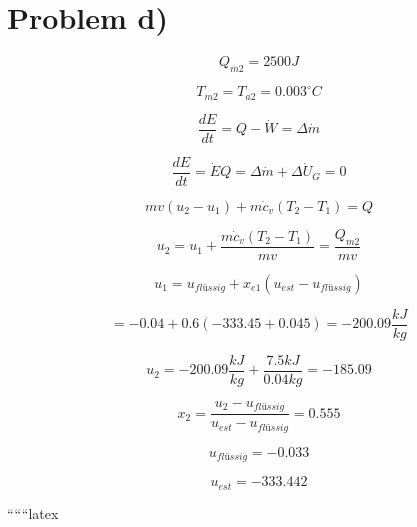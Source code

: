 \section*{Problem d)}

\[
Q_{m2} = 2500 J
\]

\[
T_{m2} = T_{a2} = 0.003^\circ C
\]

\[
\frac{dE}{dt} = Q - \dot{W} = \Delta \dot{m}
\]

\[
\frac{dE}{dt} = \dot{E}Q = \Delta \dot{m} + \Delta \dot{U}_G = 0
\]

\[
m v (u_2 - u_1) + m \dot{c}_v (T_2 - T_1) = Q
\]

\[
u_2 = u_1 + \frac{m \dot{c}_v (T_2 - T_1)}{m v} = \frac{Q_{m2}}{m v}
\]

\[
u_1 = u_{flüssig} + x_{e1} (u_{est} - u_{flüssig})
\]

\[
= -0.04 + 0.6 (-333.45 + 0.045) = -200.09 \frac{kJ}{kg}
\]

\[
u_2 = -200.09 \frac{kJ}{kg} + \frac{7.5 kJ}{0.04 kg} = -185.09
\]

\[
x_2 = \frac{u_2 - u_{flüssig}}{u_{est} - u_{flüssig}} = 0.555
\]

\[
u_{flüssig} = -0.033
\]

\[
u_{est} = -333.442
\]

``````latex